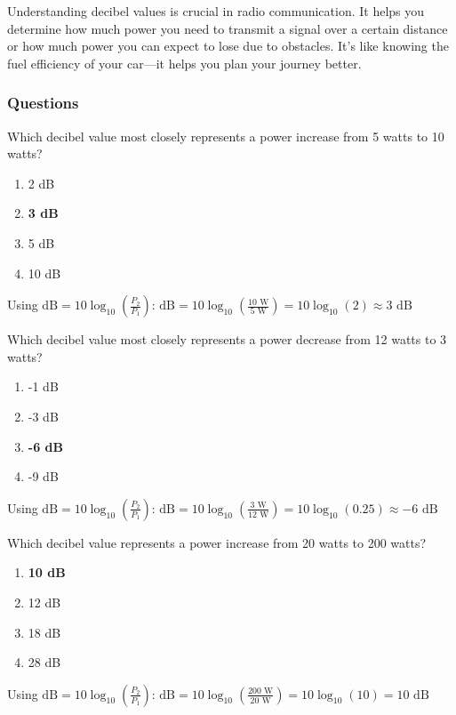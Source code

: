 Understanding decibel values is crucial in radio communication. It helps you determine how much power you need to transmit a signal over a certain distance or how much power you can expect to lose due to obstacles. It's like knowing the fuel efficiency of your car—it helps you plan your journey better.


\subsubsection{Questions}

\begin{tcolorbox}[colback=gray!10!white,colframe=black!75!black,title={T5B09}]
Which decibel value most closely represents a power increase from 5 watts to 10 watts?
\begin{enumerate}[label=\Alph*),noitemsep]
    \item 2 dB
    \item \textbf{3 dB}
    \item 5 dB
    \item 10 dB
\end{enumerate}
\end{tcolorbox}

Using $\text{dB} = 10 \log_{10}(\frac{P_2}{P_1})$:
$\text{dB} = 10 \log_{10}(\frac{10\text{ W}}{5\text{ W}}) = 10 \log_{10}(2) \approx 3\text{ dB}$

\begin{tcolorbox}[colback=gray!10!white,colframe=black!75!black,title={T5B10}]
Which decibel value most closely represents a power decrease from 12 watts to 3 watts?
\begin{enumerate}[label=\Alph*),noitemsep]
    \item -1 dB
    \item -3 dB
    \item \textbf{-6 dB}
    \item -9 dB
\end{enumerate}
\end{tcolorbox}

Using $\text{dB} = 10 \log_{10}(\frac{P_2}{P_1})$:
$\text{dB} = 10 \log_{10}(\frac{3\text{ W}}{12\text{ W}}) = 10 \log_{10}(0.25) \approx -6\text{ dB}$

\begin{tcolorbox}[colback=gray!10!white,colframe=black!75!black,title={T5B11}]
Which decibel value represents a power increase from 20 watts to 200 watts?
\begin{enumerate}[label=\Alph*),noitemsep]
    \item \textbf{10 dB}
    \item 12 dB
    \item 18 dB
    \item 28 dB
\end{enumerate}
\end{tcolorbox}

Using $\text{dB} = 10 \log_{10}(\frac{P_2}{P_1})$:
$\text{dB} = 10 \log_{10}(\frac{200\text{ W}}{20\text{ W}}) = 10 \log_{10}(10) = 10\text{ dB}$
